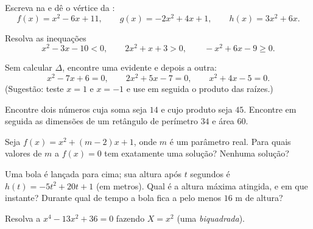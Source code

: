 \begin{exercise}[$\star$]\label{exo:g11:quad:2}
Escreva na  e dê o vértice da :
\[
f(x) = x^2 - 6x + 11, \qquad
g(x) = -2x^2 + 4x + 1, \qquad
h(x) = 3x^2 + 6x .
\]
\end{exercise}

\begin{exercise}[$\star$]\label{exo:g11:quad:3}
Resolva as inequações
\[
x^2 - 3x - 10 < 0, \qquad
2x^2 + x + 3 > 0, \qquad
-x^2 + 6x - 9 \geq 0 .
\]
\end{exercise}

\begin{exercise}[$\star$]\label{exo:g11:quad:4}
Sem calcular $\Delta$, encontre uma  evidente e depois a outra:
\[
x^2 - 7x + 6 = 0, \qquad
2x^2 + 5x - 7 = 0, \qquad
x^2 + 4x - 5 = 0 .
\]
(Sugestão: teste $x = 1$ e $x = -1$ e use em seguida o produto das
raízes.)
\end{exercise}

\begin{exercise}[$\star\star$]\label{exo:g11:quad:5}
Encontre dois números cuja soma seja $14$ e cujo produto seja $45$.
Encontre em seguida as dimensões de um retângulo de perímetro $34$ e área
$60$.
\end{exercise}

\begin{exercise}[$\star\star$]\label{exo:g11:quad:6}
Seja $f(x) = x^2 + (m-2)x + 1$, onde $m$ é um parâmetro real. Para quais
valores de $m$ a  $f(x) = 0$ tem exatamente uma solução? Nenhuma
solução?
\end{exercise}

\begin{exercise}[$\star\star$]\label{exo:g11:quad:7}
Uma bola é lançada para cima; sua altura após $t$ segundos é
$h(t) = -5t^2 + 20t + 1$ (em metros). Qual é a altura máxima atingida, e
em que instante? Durante qual  de tempo a bola fica a pelo menos
$16$ m de altura?
\end{exercise}

\begin{exercise}[$\star\star$]\label{exo:g11:quad:8}
Resolva a  $x^4 - 13x^2 + 36 = 0$ fazendo $X = x^2$ (uma 
\emph{biquadrada}).
\end{exercise}

